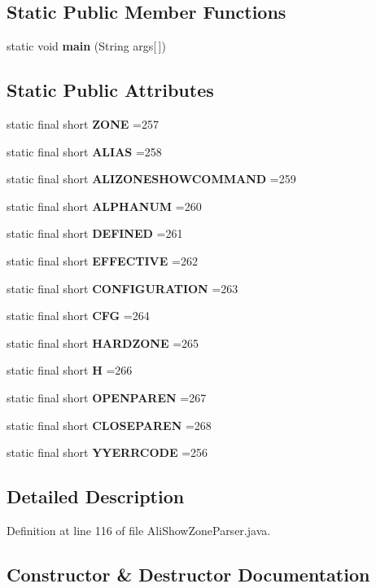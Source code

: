 \subsection*{Static Public Member Functions}
\begin{DoxyCompactItemize}
\item 
static void {\bf main} (String args[$\,$])
\end{DoxyCompactItemize}
\subsection*{Static Public Attributes}
\begin{DoxyCompactItemize}
\item 
static final short {\bf Z\+O\+N\+E} =257
\item 
static final short {\bf A\+L\+I\+A\+S} =258
\item 
static final short {\bf A\+L\+I\+Z\+O\+N\+E\+S\+H\+O\+W\+C\+O\+M\+M\+A\+N\+D} =259
\item 
static final short {\bf A\+L\+P\+H\+A\+N\+U\+M} =260
\item 
static final short {\bf D\+E\+F\+I\+N\+E\+D} =261
\item 
static final short {\bf E\+F\+F\+E\+C\+T\+I\+V\+E} =262
\item 
static final short {\bf C\+O\+N\+F\+I\+G\+U\+R\+A\+T\+I\+O\+N} =263
\item 
static final short {\bf C\+F\+G} =264
\item 
static final short {\bf H\+A\+R\+D\+Z\+O\+N\+E} =265
\item 
static final short {\bf H} =266
\item 
static final short {\bf O\+P\+E\+N\+P\+A\+R\+E\+N} =267
\item 
static final short {\bf C\+L\+O\+S\+E\+P\+A\+R\+E\+N} =268
\item 
static final short {\bf Y\+Y\+E\+R\+R\+C\+O\+D\+E} =256
\end{DoxyCompactItemize}


\subsection{Detailed Description}


Definition at line 116 of file Ali\+Show\+Zone\+Parser.\+java.



\subsection{Constructor \& Destructor Documentation}
